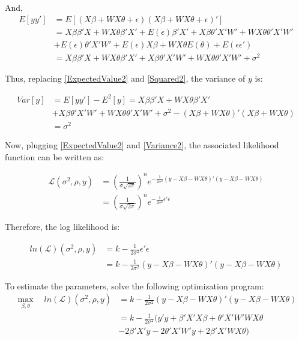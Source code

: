 \documentclass[12pt]{article}
\begin{document}
\begin{enumerate}
\begin{enumerate}
\begin{enumerate}
      And, 
      \begin{align}
          E[yy'] &= E[(X\beta + WX\theta +\epsilon) (X\beta + WX\theta +\epsilon)'] \nonumber\\
          &= X\beta \beta' X + WX \theta \beta' X' + E(\epsilon) \beta' X' + X \beta \theta' X' W' + W X \theta \theta' X' W' \nonumber \\ 
          &+ E(\epsilon) \theta' X' W' + E(\epsilon) X \beta + WX\theta E(\theta) + E(\epsilon \epsilon')\nonumber \\
          &= X\beta \beta' X + WX \theta \beta' X' +  X \beta \theta' X' W' + W X \theta \theta' X' W' + \sigma^2 \label{Squared2}
      \end{align}
      
      Thus, replacing \eqref{ExpectedValue2} and \eqref{Squared2}, the variance of $y$ is:
      
      \begin{align}
          Var[y] &= E[yy'] - E^2[y] = X\beta \beta' X + WX \theta \beta' X' \nonumber\\
          &+  X \beta \theta' X' W' + W X \theta \theta' X' W' + \sigma^2 - (X\beta + WX\theta)' (X\beta + WX\theta) \nonumber \\
          &= \sigma^2 \label{Variance2}
      \end{align}

     Now, plugging \eqref{ExpectedValue2} and \eqref{Variance2}, the associated likelihood function can be written as: 
     
     \begin{align*}
     \mathcal{L} (\sigma^2, \rho, y) &= \left( \frac{1}{\sigma \sqrt{2 \pi}}\right)^n  e^{-\frac{1}{2\sigma^2} (y- X\beta - W X \theta)' (y- X\beta - W X \theta)} \\
     &= \left( \frac{1}{\sigma \sqrt{2 \pi}}\right)^n  e^{-\frac{1}{2\sigma^2} \epsilon' \epsilon}
     \end{align*}
     
     Therefore, the log likelihood is:
      
      \begin{align*}
     ln(\mathcal{L}) (\sigma^2, \rho, y) &= k - \frac{1}{2 \sigma^2} \epsilon' \epsilon\\
     &= k - \frac{1}{2 \sigma^2} (y- X\beta - W X \theta)' (y- X\beta - W X \theta)
     \end{align*}
     
     To estimate the parameters, solve the following optimization program:
      \begin{align}
          \max_{\beta, \theta} \quad ln(\mathcal{L}) (\sigma^2, \rho, y) &= k - \frac{1}{2 \sigma^2} (y- X\beta - W X \theta)' (y- X\beta - W X \theta) \label{OptMV}\\
          &= k - \frac{1}{2 \sigma^2} (y'y + \beta' X' X \beta + \theta' X' W' W X \theta \nonumber\\
          &- 2 \beta' X' y - 2 \theta' X' W' y + 2 \beta' X' W X \theta ) \nonumber
      \end{align}
     

\end{enumerate}
\end{enumerate}
\end{enumerate}
\end{document}
